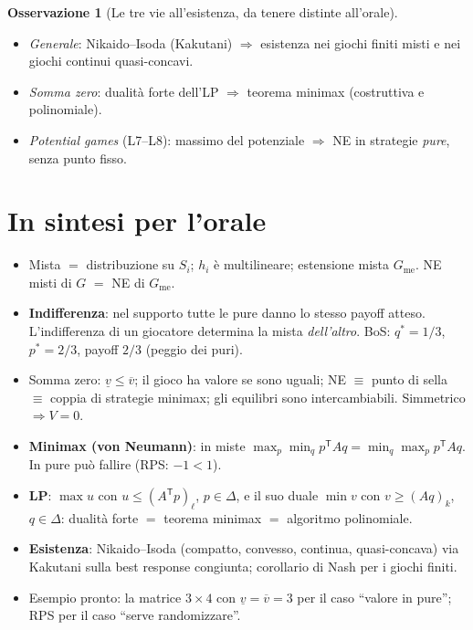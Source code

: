 \documentclass[12pt,a4paper,twoside]{book}
\theoremstyle{plain}
\theoremstyle{definition}
\newtheorem{remark}[theorem]{Osservazione}
\begin{document}
\begin{remark}[Le tre vie all'esistenza, da tenere distinte all'orale]
\begin{itemize}
  \item \emph{Generale}: Nikaido--Isoda (Kakutani) $\Rightarrow$ esistenza nei
        giochi finiti misti e nei giochi continui quasi-concavi.
  \item \emph{Somma zero}: dualità forte dell'LP $\Rightarrow$ teorema minimax
        (costruttiva e polinomiale).
  \item \emph{Potential games} (L7--L8): massimo del potenziale $\Rightarrow$ NE in
        strategie \emph{pure}, senza punto fisso.
\end{itemize}
\end{remark}

\section*{In sintesi per l'orale}
\begin{itemize}
  \item Mista $=$ distribuzione su $S_i$; $h_i$ è multilineare; estensione mista
        $G_{\mathrm{me}}$. NE misti di $G$ $=$ NE di $G_{\mathrm{me}}$.
  \item \textbf{Indifferenza}: nel supporto tutte le pure danno lo stesso payoff
        atteso. L'indifferenza di un giocatore determina la mista
        \emph{dell'altro}. BoS: $q^*=1/3$, $p^*=2/3$, payoff $2/3$ (peggio dei puri).
  \item Somma zero: $\underline v\le\overline v$; il gioco ha valore se sono uguali;
        NE $\equiv$ punto di sella $\equiv$ coppia di strategie minimax; gli
        equilibri sono intercambiabili. Simmetrico $\Rightarrow V=0$.
  \item \textbf{Minimax (von Neumann)}: in miste $\max_p\min_q p^{\mathsf T}Aq=
        \min_q\max_p p^{\mathsf T}Aq$. In pure può fallire (RPS: $-1<1$).
  \item \textbf{LP}: $\max u$ con $u\le (A^{\mathsf T}p)_\ell$, $p\in\Delta$, e il
        suo duale $\min v$ con $v\ge (Aq)_k$, $q\in\Delta$: dualità forte $=$
        teorema minimax $=$ algoritmo polinomiale.
  \item \textbf{Esistenza}: Nikaido--Isoda (compatto, convesso, continua,
        quasi-concava) via Kakutani sulla best response congiunta; corollario di
        Nash per i giochi finiti.
  \item Esempio pronto: la matrice $3\times 4$ con $\underline v=\overline v=3$ per
        il caso ``valore in pure''; RPS per il caso ``serve randomizzare''.
\end{itemize}
\end{document}
